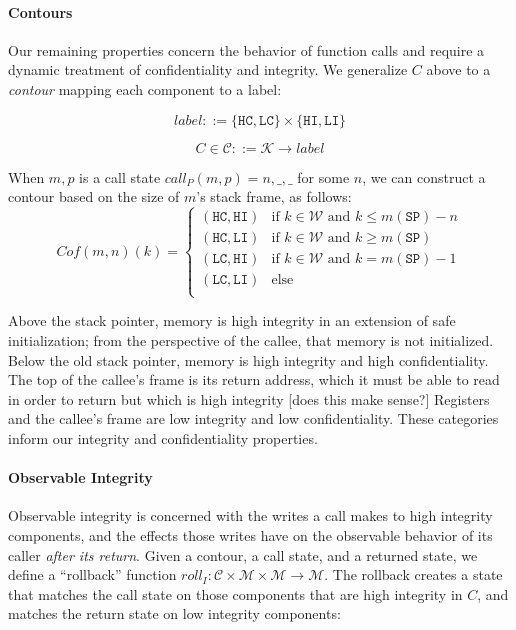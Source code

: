 \documentclass{article}
\begin{document}
    \paragraph{Contours}

      Our remaining properties concern the behavior of function calls and require a dynamic treatment
      of confidentiality and integrity. We generalize \(C\) above to a {\it contour} mapping each component
      to a label:

      \[\mathit{label} ::= \{\mathtt{HC},\mathtt{LC}\} \times \{\mathtt{HI},\mathtt{LI}\}\]

      \[C \in \mathcal{C} ::= \mathcal{K} \rightarrow \mathit{label}\]

      When \(m,p\) is a call state \(\mathit{call}_P(m,p) = n,\_,\_\) for some \(n\),
      we can construct a contour based on the size of \(m\)'s stack frame, as follows:
      \[Cof(m,n)(k) =
      \begin{cases}
        (\mathtt{HC},\mathtt{HI}) & \text{if } k \in \mathcal{W}
                                    \text{ and } k \leq m(\mathtt{SP}) - n \\
        (\mathtt{HC},\mathtt{LI}) & \text{if } k \in \mathcal{W}
                                    \text{ and } k \geq m(\mathtt{SP}) \\
        (\mathtt{LC},\mathtt{HI}) & \text{if } k \in \mathcal{W}
                                    \text{ and } k = m(\mathtt{SP}) - 1 \\
        (\mathtt{LC},\mathtt{LI}) & \text{else} \\
      \end{cases}\]

      Above the stack pointer, memory is high integrity in an extension of safe initialization;
      from the perspective of the callee, that memory is not initialized. Below the old stack
      pointer, memory is high integrity and high confidentiality. The top of the callee's frame
      is its return address, which it must be able to read in order to return but which is
      high integrity [does this make sense?] Registers and the callee's frame are low integrity
      and low confidentiality. These categories inform our integrity and confidentiality properties.

    \paragraph{Observable Integrity}

      Observable integrity is concerned with the writes a call makes to high integrity components,
      and the effects those writes have on the observable behavior of its caller
      {\it after its return}. Given a contour, a call state, and a returned state, we define
      a ``rollback'' function \(\mathit{roll}_I : \mathcal{C} \times \mathcal{M} \times \mathcal{M}
      \rightarrow \mathcal{M}\). The rollback creates a state that matches the call
      state on those components that are high integrity in \(C\), and matches the return state
      on low integrity components:
\end{document}
